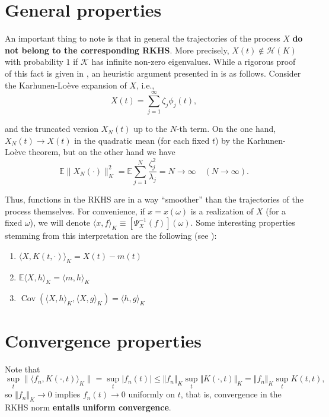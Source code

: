 \documentclass[11pt]{article}
\begin{document}
\section*{General properties}

  An important thing to note is that in general the trajectories of the process $X$ \textbf{do not belong to the corresponding RKHS}. More precisely, $X(t)\notin \mathcal H(K)$ with probability $1$ if $\mathcal K$ has infinite non-zero eigenvalues. While a rigorous proof of this fact is given in \citet{hajek1962}, an heuristic argument presented in \citet{wahba1990} is as follows. Consider the Karhunen-Loève expansion of $X$, i.e.,
  \[
  X(t) = \sum_{j=1}^\infty \zeta_j \phi_j(t),
  \]

  and the truncated version $X_N(t)$ up to the $N$-th term. On the one hand, $X_N(t)\to X(t)$ in the quadratic mean (for each fixed $t$) by the Karhunen-Loève theorem, but on the other hand we have
  \[
\mathbb E\|X_N(\cdot)\|^2_K = \mathbb E \sum_{j=1}^N \frac{\zeta_j^2}{\lambda_j} = N \to \infty \quad (N\to\infty).
  \]

  Thus, functions in the RKHS are in a way ``smoother'' than the trajectories of the process themselves. For convenience, if $x=x(\omega)$ is a realization of $X$ (for a fixed $\omega$), we will denote $\langle x, f\rangle_K \equiv \left[\Psi_X^{-1}(f)\right](\omega)$. Some interesting properties stemming from this interpretation are the following (see \citet[p.~974]{parzen1961b}):

  \begin{enumerate}

    \item $\langle X, K(t, \cdot)\rangle_K = X(t) - m(t)$

    \item $\mathbb{E} \langle X, h\rangle_K = \langle m, h\rangle_K$

    \item $\operatorname{Cov}\left(\langle X, h \rangle_K , \langle X, g\rangle_K\right) = \langle h, g\rangle_K$

  \end{enumerate}


\section*{Convergence properties}

Note that
\[
		\sup_t \|\langle f_n,K(\cdot,t)\rangle_K\|=\sup_t|f_n(t)|\leq \Vert f_n\Vert_K \sup_t\Vert K(\cdot,t)\Vert_K
		=\Vert f_n\Vert_K \sup_t K(t,t),
\]
		so $\Vert f_n\Vert_K \to 0$ implies $f_n(t)\to 0$ uniformly on $t$, that is, convergence in the RKHS norm \textbf{entails uniform convergence}.
\end{document}
